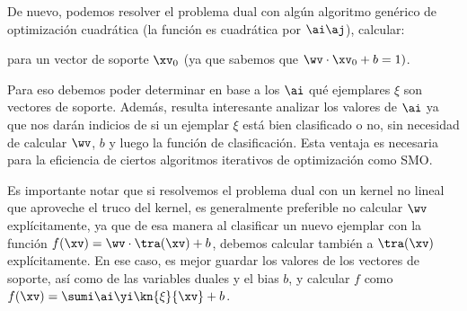 De nuevo, podemos resolver el problema dual con algún algoritmo genérico de optimización cuadrática (la función es cuadrática por $\ai \aj$), calcular:


para un vector de soporte $\xv_0$ (ya que sabemos que $\wv \cdot \xv_0 +b =1)$. 

Para eso debemos poder determinar en base a los $\ai$ qué ejemplares $\xi$ son vectores de soporte. Además, resulta interesante analizar los valores de $\ai$ ya que nos darán indicios de si un ejemplar $\xi$ está bien clasificado o no, sin necesidad de calcular $\wv$, $b$ y luego la función de clasificación. Esta ventaja es necesaria para la eficiencia de ciertos algoritmos iterativos de optimización como SMO. 


Es importante notar que si resolvemos el problema dual con un kernel no lineal que aproveche el truco del kernel, es generalmente preferible no calcular $\wv$ explícitamente, ya que de esa manera al clasificar un nuevo ejemplar con la función $f(\xv)=\wv \cdot \tra(\xv) +b$, debemos calcular también a $\tra(\xv)$ explícitamente. En ese caso, es mejor guardar los valores de los vectores de soporte, así como de las variables duales y el bias $b$, y calcular $f$ como $f(\xv)=   \sumi \ai \yi \kn{\xi}{\xv} +b$.
